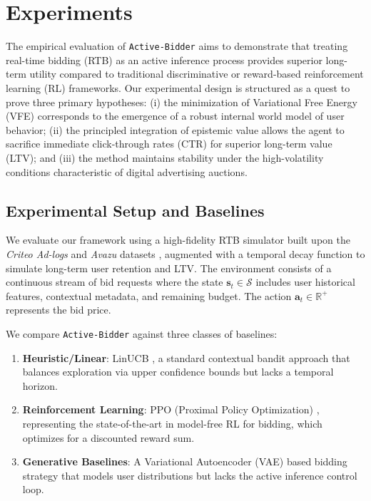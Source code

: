 \section{Experiments}
\label{sec:experiments}

The empirical evaluation of \texttt{Active-Bidder} aims to demonstrate that treating real-time bidding (RTB) as an active inference process provides superior long-term utility compared to traditional discriminative or reward-based reinforcement learning (RL) frameworks. Our experimental design is structured as a quest to prove three primary hypotheses: (i) the minimization of Variational Free Energy (VFE) corresponds to the emergence of a robust internal world model of user behavior; (ii) the principled integration of epistemic value allows the agent to sacrifice immediate click-through rates (CTR) for superior long-term value (LTV); and (iii) the method maintains stability under the high-volatility conditions characteristic of digital advertising auctions.

\subsection{Experimental Setup and Baselines}

We evaluate our framework using a high-fidelity RTB simulator built upon the \textit{Criteo Ad-logs} and \textit{Avazu} datasets \cite{diemert2018criteo}, augmented with a temporal decay function to simulate long-term user retention and LTV. The environment consists of a continuous stream of bid requests where the state $\mathbf{s}_t \in \mathcal{S}$ includes user historical features, contextual metadata, and remaining budget. The action $\mathbf{a}_t \in \mathbb{R}^+$ represents the bid price.

We compare \texttt{Active-Bidder} against three classes of baselines:
\begin{enumerate}
    \item \textbf{Heuristic/Linear}: LinUCB \cite{li2010contextual}, a standard contextual bandit approach that balances exploration via upper confidence bounds but lacks a temporal horizon.
    \item \textbf{Reinforcement Learning}: PPO (Proximal Policy Optimization) \cite{schulman2017proximal}, representing the state-of-the-art in model-free RL for bidding, which optimizes for a discounted reward sum.
    \item \textbf{Generative Baselines}: A Variational Autoencoder (VAE) based bidding strategy that models user distributions but lacks the active inference control loop.
\end{enumerate}

